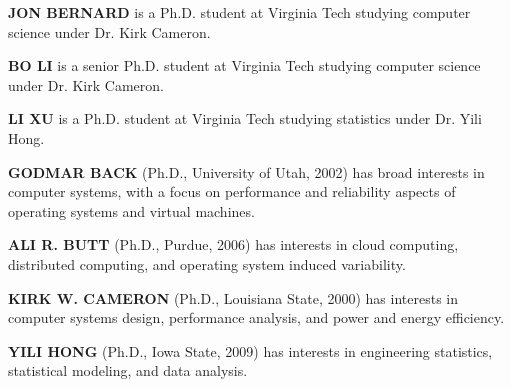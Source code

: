 \documentclass{scspaperproc}
\theoremstyle{scsthe}
\begin{document}
\textbf{\uppercase{Jon Bernard}} is a Ph.D. student at Virginia Tech
studying computer science under Dr. Kirk Cameron.

\textbf{\uppercase{Bo Li}} is a senior Ph.D. student at Virginia Tech
studying computer science under Dr. Kirk Cameron.

\textbf{\uppercase{Li Xu}} is a Ph.D. student at Virginia Tech studying
statistics under Dr. Yili Hong.

\textbf{\uppercase{Godmar Back}} (Ph.D., University of Utah, 2002) has
broad interests in computer systems, with a focus on performance and
reliability aspects of operating systems and virtual machines.

\textbf{\uppercase{Ali R. Butt}} (Ph.D., Purdue, 2006) has interests in cloud computing, distributed computing, and operating system induced variability.

\textbf{\uppercase{Kirk W. Cameron}} (Ph.D., Louisiana State, 2000) has
interests in computer systems design, performance analysis, and power and
energy efficiency.

\textbf{\uppercase{Yili Hong}} (Ph.D., Iowa State, 2009) has interests in
engineering statistics, statistical modeling, and data analysis.
\end{document}
